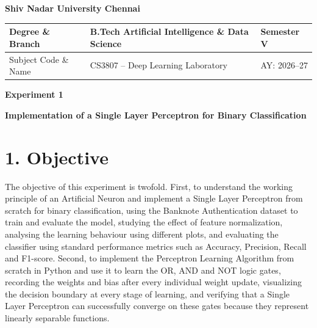 \documentclass[11pt,a4paper]{article}
\begin{document}
\raggedbottom

\setlength{\textfloatsep}{10pt}
\setlength{\floatsep}{8pt}
\setlength{\intextsep}{8pt}


\begin{center}

{\Large \textbf{Shiv Nadar University Chennai}}

\vspace{0.3cm}

\begin{tabular}{|p{4cm}|p{8cm}|p{2cm}|}
\hline
Degree \& Branch &
B.Tech Artificial Intelligence \& Data Science &
Semester V\\
\hline
Subject Code \& Name &
CS3807 -- Deep Learning Laboratory &
AY: 2026--27\\
\hline
\end{tabular}

\vspace{0.7cm}

{\Large \textbf{Experiment 1}}

\vspace{0.2cm}

{\large \textbf{Implementation of a Single Layer Perceptron for Binary Classification}}

\end{center}

\section*{1. Objective}

The objective of this experiment is twofold. First, to understand the working principle of an Artificial Neuron and implement a Single Layer Perceptron from scratch for binary classification, using the Banknote Authentication dataset to train and evaluate the model, studying the effect of feature normalization, analysing the learning behaviour using different plots, and evaluating the classifier using standard performance metrics such as Accuracy, Precision, Recall and F1-score. Second, to implement the Perceptron Learning Algorithm from scratch in Python and use it to learn the OR, AND and NOT logic gates, recording the weights and bias after every individual weight update, visualizing the decision boundary at every stage of learning, and verifying that a Single Layer Perceptron can successfully converge on these gates because they represent linearly separable functions.
\end{document}
